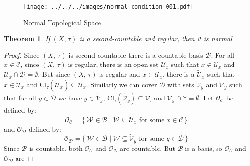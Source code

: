 \documentclass{article}
\theoremstyle{plain}
\newtheorem{theorem}{Theorem}[section]
\theoremstyle{normal}
\begin{document}
        \begin{figure}
            \centering
            \texttt{[image: ../../../images/normal\_condition\_001.pdf]}
            \caption{Normal Topological Space}
            \label{fig:normal_condition_001}
        \end{figure}
        \begin{theorem}
            If $(X,\,\tau)$ is a second-countable and regular, then it is
            normal.
        \end{theorem}
        \begin{proof}
            Since $(X,\,\tau)$ is second-countable there is a countable basis
            $\mathcal{B}$. For all $x\in\mathcal{C}$, since $(X,\,\tau)$ is
            regular, there is an open set $\mathcal{U}_{x}$ such that
            $x\in\mathcal{U}_{x}$ and
            $\mathcal{U}_{x}\cap\mathcal{D}=\emptyset$. But since
            $(X,\,\tau)$ is regular and $x\in\mathcal{U}_{x}$, there is a
            $\tilde{\mathcal{U}}_{x}$ such that $x\in\tilde{\mathcal{U}}_{x}$
            and $\textrm{Cl}_{\tau}(\tilde{\mathcal{U}}_{x})\subseteq\mathcal{U}_{x}$.
            Similarly we can cover $\mathcal{D}$ with sets
            $\mathcal{V}_{y}$ and $\tilde{\mathcal{V}}_{y}$ such that for all
            $y\in\mathcal{D}$ we have
            $y\in\tilde{\mathcal{V}}_{y}$,
            $\textrm{Cl}_{\tau}(\tilde{\mathcal{V}}_{y})\subseteq\mathcal{V}$,
            and $\mathcal{V}_{y}\cap\mathcal{C}=\emptyset$. Let
            $\mathcal{O}_{\mathcal{C}}$ be
            defined by:
            \begin{equation}
                \mathcal{O}_{\mathcal{C}}
                =\{\,\mathcal{W}\in\mathcal{B}\;|\;
                    \mathcal{W}\subseteq\tilde{\mathcal{U}}_{x}
                    \textrm{ for some }x\in\mathcal{C}\,\}
            \end{equation}
            and $\mathcal{O}_{\mathcal{D}}$ defined by:
            \begin{equation}
                \mathcal{O}_{\mathcal{D}}
                =\{\,\mathcal{W}\in\mathcal{B}\;|\;
                    \mathcal{W}\subseteq\tilde{\mathcal{V}}_{y}
                    \textrm{ for some }y\in\mathcal{D}\,\}
            \end{equation}
            Since $\mathcal{B}$ is countable, both
            $\mathcal{O}_{\mathcal{C}}$ and $\mathcal{O}_{\mathcal{D}}$ are
            countable. But $\mathcal{B}$ is a basis, so
            $\mathcal{O}_{\mathcal{C}}$ and $\mathcal{O}_{\mathcal{D}}$ are

\end{proof}
\end{document}
